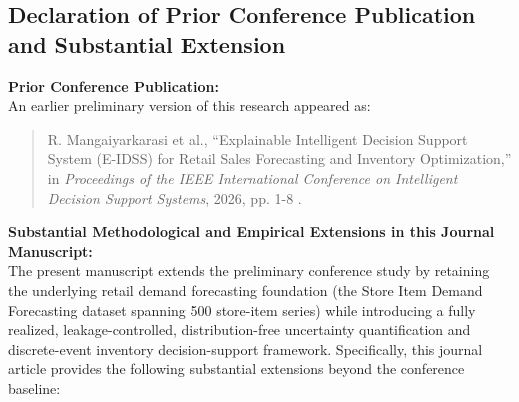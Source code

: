 \documentclass[11pt,a4paper]{article}
\begin{document}
\subsection*{Declaration of Prior Conference Publication and Substantial Extension}

\noindent \textbf{Prior Conference Publication:} \\
An earlier preliminary version of this research appeared as:
\begin{quote}
\small
R. Mangaiyarkarasi et al., ``Explainable Intelligent Decision Support System (E-IDSS) for Retail Sales Forecasting and Inventory Optimization,'' in \emph{Proceedings of the IEEE International Conference on Intelligent Decision Support Systems}, 2026, pp. 1-8 \cite{e_idss_ieee}.
\end{quote}

\noindent \textbf{Substantial Methodological and Empirical Extensions in this Journal Manuscript:} \\
The present manuscript extends the preliminary conference study by retaining the underlying retail demand forecasting foundation (the Store Item Demand Forecasting dataset spanning 500 store-item series) while introducing a fully realized, leakage-controlled, distribution-free uncertainty quantification and discrete-event inventory decision-support framework. Specifically, this journal article provides the following substantial extensions beyond the conference baseline:
\end{document}

